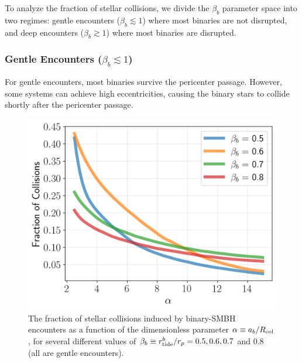 \documentclass[twocolumn]{aastex631}
\begin{document}
To analyze the fraction of stellar collisions, we divide the $\beta_b$ parameter space into two regimes:
gentle encounters ($\beta_b \lesssim 1$) where most binaries are not disrupted, and deep encounters ($\beta_b \gtrsim 1$) where most binaries are disrupted.


\subsubsection{Gentle Encounters (\texorpdfstring{$\beta_b \lesssim 1$}{β<1})}
\label{sec:br_regime1}

For gentle encounters, most binaries survive the pericenter passage. 
However, some systems can achieve high eccentricities, causing the binary stars to collide shortly after the pericenter passage. 

\begin{figure}[htbp]
\centering
\includegraphics[width=1.02\columnwidth]{figures/col_frac_lowbeta.png}
\caption{
The fraction of stellar collisions induced by binary-SMBH encounters as a function of the dimensionless parameter $\alpha \equiv a_b / R_{\rm col}$, for several different values of $\beta_b \equiv r_{\rm tide}^b/r_p=0.5, 0.6, 0.7$ and $0.8$ (all are gentle encounters).}
\label{Fig:col_frac_lowbeta}
\end{figure}
\end{document}
